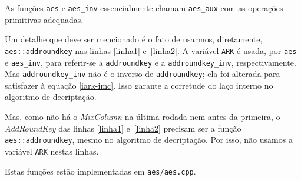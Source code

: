 \documentclass{article}
\begin{document}
As funções \verb"aes" e \verb"aes_inv" essencialmente chamam \verb"aes_aux"
com as operações primitivas adequadas.

Um detalhe que deve ser mencionado é o fato de usarmos, diretamente,
\verb"aes::addroundkey" nas linhas \ref{linha1} e~\ref{linha2}.
A variável \verb"ARK" é usada,
por \verb"aes" e \verb"aes_inv",
para referir-se a \verb"addroundkey" e a \verb"addroundkey_inv",
respectivamente.
Mas \verb"addroundkey_inv" não é o inverso de \verb"addroundkey";
ela foi alterada para satisfazer à equação \ref{iark-imc}.
Isso garante a corretude do laço interno no algoritmo de decriptação.

Mas, como não há o \emph{MixColumn} na última rodada
nem antes da primeira,
o \emph{AddRoundKey} das linhas \ref{linha1} e~\ref{linha2}
precisam ser a função \verb"aes::addroundkey",
mesmo no algoritmo de decriptação.
Por isso, não usamos a variável \verb"ARK" nestas linhas.

Estas funções estão implementadas em \verb"aes/aes.cpp".
\end{document}
